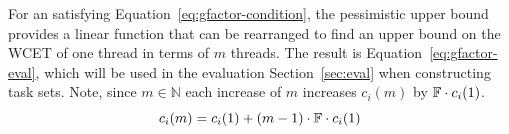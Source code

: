 \documentclass[a4paper,UKenglish,cleveref,autoref,english]{lipics-v2019}
\begin{document}
For an \GFactor{} satisfying Equation~\ref{eq:gfactor-condition}, the
pessimistic upper bound provides a linear function that can be
rearranged to find an upper bound on the WCET of one thread in terms
of ${m}$ threads. 
The result is Equation~\ref{eq:gfactor-eval}, which will be
used in the evaluation Section~\ref{sec:eval} when constructing
task sets. Note, since ${m \in \mathbb{N}}$ each increase of ${m}$ 
increases ${c_i(m)}$ by ${\mathbb{F}{} \cdot c_i(1)}$.
\begin{equation}
  \label{eq:gfactor-eval}
  c_i(m) = c_i(1) + (m - 1) \cdot \mathbb{F}{} \cdot c_i(1)
\end{equation}












\end{document}
